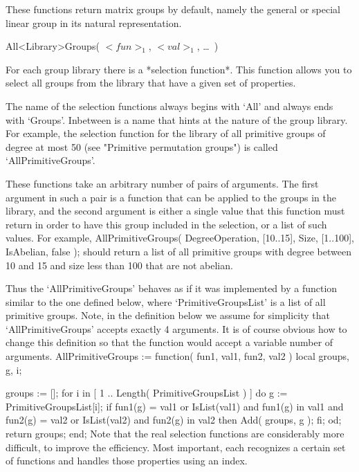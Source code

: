 These  functions return matrix groups by  default,  namely the general or
special linear group in its natural representation.


\)\fmark All<Library>Groups( $<fun>_1$, $<val>_1$, \dots\ )

For each  group library there  is a  *selection function*.  This function
allows you to select all groups from the library that have a given set of
properties.

The name of the selection  functions always begins  with `All' and always
ends with `Groups'. Inbetween is a  name that hints at  the nature of the
group library. For example, the selection function for the library of all
primitive  groups of degree    at  most 50 (see  "Primitive   permutation
groups") is called `AllPrimitiveGroups'.

These  functions take an  arbitrary number of  pairs of  arguments.   The
first argument in such a pair  is a function  that can  be applied to the
groups in the library,  and the second  argument is either a single value
that this  function must return in  order  to have this group included in
the selection, or a list of such values. For example,
\beginexample
    AllPrimitiveGroups( DegreeOperation,  [10..15],
                        Size,             [1..100],
                        IsAbelian,        false    );
\endexample
should return a list of all primitive  groups with  degree between 10 and
15 and size less than 100 that are not abelian.

Thus  the `AllPrimitiveGroups'  behaves  as if   it was implemented  by a
function similar to the one defined below, where `PrimitiveGroupsList' is
a list of all primitive groups.  Note, in  the definition below we assume
for simplicity that `AllPrimitiveGroups' accepts exactly 4 arguments.  It
is of course  obvious how to change this  definition so that the function
would accept a variable number of arguments.
\begintt
    AllPrimitiveGroups := function( fun1, val1, fun2, val2 )
        local    groups, g, i;

        groups := [];
        for i  in [ 1 .. Length( PrimitiveGroupsList ) ] do
            g := PrimitiveGroupsList[i];
            if      fun1(g) = val1  or IsList(val1) and fun1(g) in val1
                and fun2(g) = val2  or IsList(val2) and fun2(g) in val2
            then
                Add( groups, g );
            fi;
        od;
        return groups;
    end;
\endtt
Note that the real  selection functions are considerably  more difficult,
to improve the efficiency. Most  important, each recognizes a certain set
of functions and handles those properties using an index.


